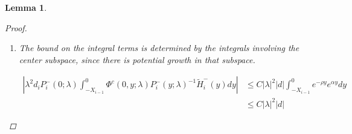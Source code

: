 \documentclass[12pt]{article}
\newtheorem{lemma}{Lemma}
\begin{document}
\begin{lemma}
\begin{proof}
\begin{enumerate}
To put this in terms of $c_i^-$, we use the expression

\[
c_i^+ = c_i^- + P_0^c(\lambda) D_i d + A_2(\lambda)_i^c(b, c^-, d) )
\]

from Lemma \ref{inv1}, together with the bound for $A_2$.

\begin{align*}
e^{-\nu(\lambda)X_i} c_i^+ &= e^{-\nu(\lambda)X_i} c_i^- 
+ e^{-\nu(\lambda)X_i} P_0^c(\lambda) D_i d + e^{-\nu(\lambda)X_i} A_2(\lambda)_i^c(b, d)\\
&= e^{-\nu(\lambda)X_i} c_i^- + \mathcal{O}\Big( e^{-(\alpha - \rho) X_i} ( |\lambda| + e^{-\alpha X_i} ) |d|) + e^{-(\alpha - \rho) X_i} (|b_i^+| + |b_{i+1}^-| + |c_i^-|)\\
&+ e^{-(\alpha - 2 \rho) X_i} |\lambda|^2|d| + e^{-(\alpha - \rho) X_i} |D_i||d| )
\end{align*}

Thus we have the expression for $e^{-\nu(\lambda)X_i} c_i^+$

\begin{align}\label{tildecminus}
e^{-\nu(\lambda)X_i} c_i^+
&= e^{-\nu(\lambda)X_i} c_i^- + \mathcal{O}\Big( e^{-(\alpha - \rho) X_i} ( |b_i^+| + |b_{i+1}^-| + |c_i^-| + |\lambda||d| + |D_i||d|) \Big)
\end{align}

which gives us the overall estimate

\begin{align*}
&|(P_i^+(0; \lambda) - P^+(0))P_0^c(0) e^{-\nu(\lambda)X_i} c_i^+ + P_i^+(0; \lambda) (P_0^c(\lambda) - P_0^c(0)) e^{-\nu(\lambda)X_i} c_i^+| \\
&\leq C \Big( (e^{-\alpha X_m} + |\lambda|)( e^{-\nu(\lambda)X_i} c_i^- + e^{-(\alpha - \rho) X_i} ( |b_i^+| + |b_{i+1}^-| + |c_i^-| + |\lambda||d| + |D_i||d|) \Big) \\
&\leq C \Big( (e^{-\alpha X_m} + |\lambda|)( |\tilde{c}_i^-| + e^{-(\alpha - \rho) X_i} ( |b_i^+| + |b_{i+1}^-| + |c_i^-| + |\lambda||d| + |D_i||d|) \Big)
\end{align*}

\item The bound on the integral terms is determined by the integrals involving the center subspace, since there is potential growth in that subspace.

\begin{align*}
\left| \lambda^2 d_i P_i^-(0; \lambda) \int_{-X_{i-1}}^0 \Phi^c(0, y; \lambda) P_i^-(y; \lambda)^{-1} \tilde{H}_i^-(y) dy \right| &\leq C |\lambda|^2 |d| \int_{-X_{i-1}}^0 e^{-\rho y} e^{\alpha y} dy \\
&\leq C |\lambda|^2 |d|
\end{align*}


\end{enumerate}
\end{proof}
\end{lemma}
\end{document}
